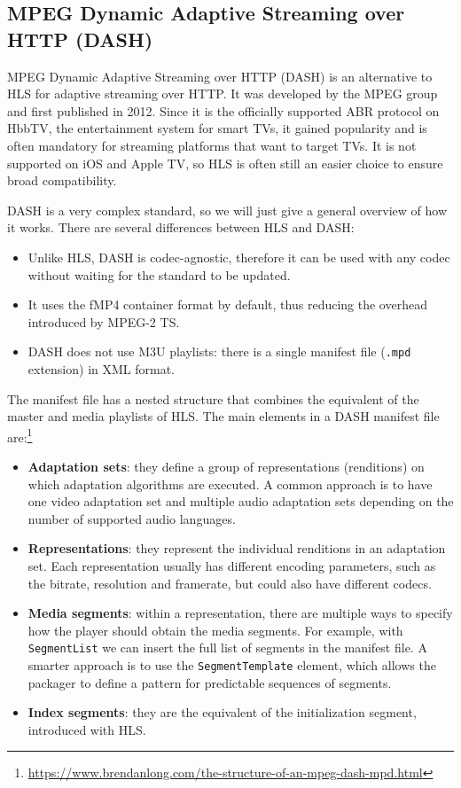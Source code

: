 \subsection{MPEG Dynamic Adaptive Streaming over HTTP (DASH)}
\label{sec:bg/technologies/dash}

MPEG Dynamic Adaptive Streaming over HTTP (DASH) is an alternative to HLS for adaptive streaming over HTTP. It was developed by the MPEG group and first published in 2012. Since it is the officially supported ABR protocol on HbbTV, the entertainment system for smart TVs, it gained popularity and is often mandatory for streaming platforms that want to target TVs. It is not supported on iOS and Apple TV, so HLS is often still an easier choice to ensure broad compatibility.

DASH is a very complex standard, so we will just give a general overview of how it works.\cite{dash}\cite{dash2} There are several differences between HLS and DASH:

\begin{itemize}
    \item Unlike HLS, DASH is codec-agnostic, therefore it can be used with any codec without waiting for the standard to be updated.
    \item It uses the fMP4 container format by default, thus reducing the overhead introduced by MPEG-2 TS.
    \item DASH does not use M3U playlists: there is a single manifest file (\texttt{.mpd} extension) in XML format.
\end{itemize}

The manifest file has a nested structure that combines the equivalent of the master and media playlists of HLS. The main elements in a DASH manifest file are:\footnote{\url{https://www.brendanlong.com/the-structure-of-an-mpeg-dash-mpd.html}}

\begin{itemize}
    \item \textbf{Adaptation sets}: they define a group of representations (renditions) on which adaptation algorithms are executed. A common approach is to have one video adaptation set and multiple audio adaptation sets depending on the number of supported audio languages.
    \item \textbf{Representations}: they represent the individual renditions in an adaptation set. Each representation usually has different encoding parameters, such as the bitrate, resolution and framerate, but could also have different codecs.
    \item \textbf{Media segments}: within a representation, there are multiple ways to specify how the player should obtain the media segments. For example, with \texttt{SegmentList} we can insert the full list of segments in the manifest file. A smarter approach is to use the \texttt{SegmentTemplate} element, which allows the packager to define a pattern for predictable sequences of segments.
    \item \textbf{Index segments}: they are the equivalent of the initialization segment, introduced with HLS.
\end{itemize}

